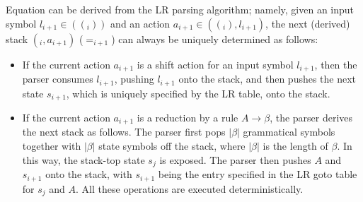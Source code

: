 \documentclass[a4j]{article}
\def\st{}
\def\La{}
\def\Act{}
\def\top{}
\def\goto{}
\def\eq#1{}
\begin{document}
Equation \eq{st0} can be derived from the LR parsing algorithm; namely,
given an input symbol $l_{i+1}\in\La(\top(\st_i))$ and an action
$a_{i+1}\in\Act(\top(\st_i),l_{i+1})$, the next (derived) stack
$\goto(\st_i,a_{i+1})$ ($=\st_{i+1}$) can always be uniquely determined
as follows:
\begin{itemize}
\item If the current action $a_{i+1}$ is a shift action for an input
  symbol $l_{i+1}$, then the parser consumes $l_{i+1}$, pushing
  $l_{i+1}$ onto the stack, and then pushes the next state $s_{i+1}$,
  which is uniquely specified by the LR table, onto the stack.
\item If the current action $a_{i+1}$ is a reduction by a rule
$A\to\beta$, the parser derives the next stack as follows. The parser
first pops $|\beta|$ grammatical symbols together with $|\beta|$ state
symbols off the stack, where $|\beta|$ is the length of $\beta$. In this
way, the stack-top state $s_j$ is exposed. The parser then pushes $A$
and $s_{i+1}$ onto the stack, with $s_{i+1}$ being the entry specified
in the LR goto table for $s_j$ and $A$. All these operations are
executed deterministically.
\end{itemize}
\end{document}
